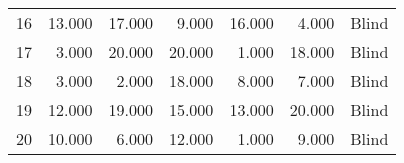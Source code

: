 \begin{table}[!htb]
\begin{tabular}{lrrrrrl}
16   & 13.000 & 17.000 &        9.000 &        16.000 &    4.000 &             Blind \\
17   &  3.000 & 20.000 &       20.000 &         1.000 &   18.000 &             Blind \\
18   &  3.000 &  2.000 &       18.000 &         8.000 &    7.000 &             Blind \\
19   & 12.000 & 19.000 &       15.000 &        13.000 &   20.000 &             Blind \\
20   & 10.000 &  6.000 &       12.000 &         1.000 &    9.000 &             Blind \\
\bottomrule
\end{tabular}
\end{table}


 \FloatBarrier 
